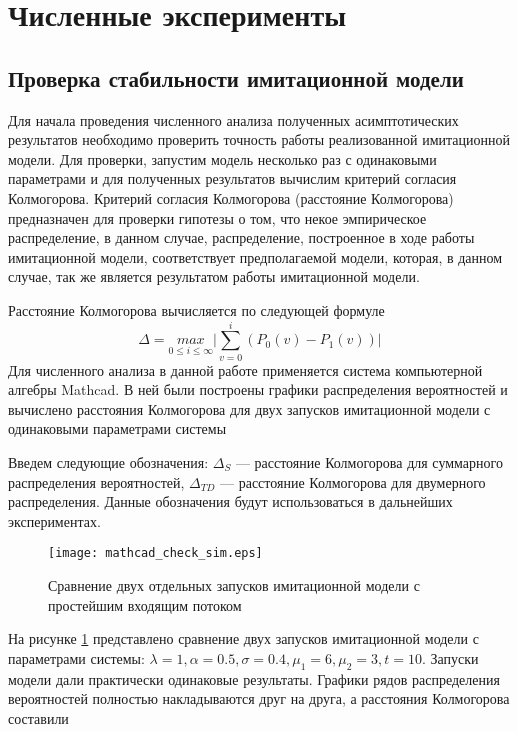 \section{Численные эксперименты}
\subsection{Проверка стабильности имитационной модели}
Для начала проведения численного анализа полученных асимптотических результатов необходимо проверить точность работы реализованной имитационной модели. Для проверки, запустим модель несколько раз с одинаковыми параметрами и для полученных результатов вычислим критерий согласия Колмогорова. Критерий согласия Колмогорова (расстояние Колмогорова) предназначен для проверки гипотезы о том, что некое эмпирическое распределение, в данном случае, распределение, построенное в ходе работы имитационной модели, соответствует предполагаемой модели, которая, в данном случае, так же является результатом работы имитационной модели.

Расстояние Колмогорова вычисляется по следующей формуле
\begin{equation*}
	\Delta = \underset{0 \leq i \leq \infty}{max}\bigg\rvert \sum_{v=0}^{i} (P_0(v) - P_1(v))\bigg\rvert
\end{equation*}
Для численного анализа в данной работе применяется система компьютерной алгебры Mathcad. В ней были построены графики распределения вероятностей и вычислено расстояния Колмогорова для двух запусков имитационной модели с одинаковыми параметрами системы

Введем следующие обозначения: $\Delta_S$ --- расстояние Колмогорова для суммарного распределения вероятностей, $\Delta_{TD}$ --- расстояние Колмогорова для двумерного распределения. Данные обозначения будут использоваться в дальнейших экспериментах.

\begin{figure}[H]
	\centering
	\texttt{[image: mathcad\_check\_sim.eps]}
	\caption{Сравнение двух отдельных запусков имитационной модели с простейшим входящим потоком}
	\label{experiments_kol_dist_sim}
\end{figure} 

На рисунке \ref{experiments_kol_dist_sim} представлено сравнение двух запусков имитационной модели с параметрами системы: $\lambda = 1, \alpha = 0.5, \sigma = 0.4, \mu_{1} = 6, \mu_{2} = 3, t = 10 $. Запуски модели дали практически одинаковые результаты. Графики рядов распределения вероятностей полностью накладываются друг на друга, а расстояния Колмогорова составили

